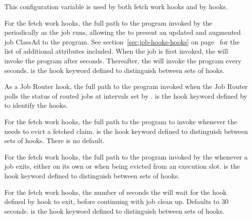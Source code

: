 \begin{description}
\label{param:HookUpdateJobInfo}
\item[\Macro{<Keyword>\_HOOK\_UPDATE\_JOB\_INFO}]
  This configuration variable is used by both fetch work hooks and
  by  hooks.

  For the fetch work hooks,
  the full path to the program invoked by the  periodically
  as the job runs, allowing the  to present an updated
  and augmented job ClassAd to the program.
  See section~\ref{sec:job-hooks-hooks} on page~\pageref{sec:job-hooks-hooks}
  for the list of additional attributes included.
  When the job is first invoked, the  will invoke the program
  after  seconds.
  Thereafter, the  will invoke the program every 
   seconds.
   is the hook keyword defined to distinguish
  between sets of hooks.

  As a Job Router hook,
  the full path to the program invoked when the Job Router polls the status
  of routed jobs at intervals set by .
   is the hook keyword defined by
   to identify the hooks.

\label{param:HookEvictClaim}
\item[\Macro{<Keyword>\_HOOK\_EVICT\_CLAIM}]
  For the fetch work hooks,
  the full path to the program to invoke whenever the 
  needs to evict a fetched claim.
   is the hook keyword defined to distinguish
  between sets of hooks.
  There is no default.

\label{param:HookJobExit}
\item[\Macro{<Keyword>\_HOOK\_JOB\_EXIT}]
  For the fetch work hooks,
  the full path to the program invoked by the 
  whenever a job exits,
  either on its own or when being evicted from an execution slot. 
   is the hook keyword defined to distinguish
  between sets of hooks.

\label{param:HookJobExitTimeout}
\item[\Macro{<Keyword>\_HOOK\_JOB\_EXIT\_TIMEOUT}]
  For the fetch work hooks,
  the number of seconds the  will wait for the hook
  defined by  hook to exit,
  before continuing with job clean up.  Defaults to 30 seconds.
   is the hook keyword defined to distinguish
  between sets of hooks.


\end{description}
